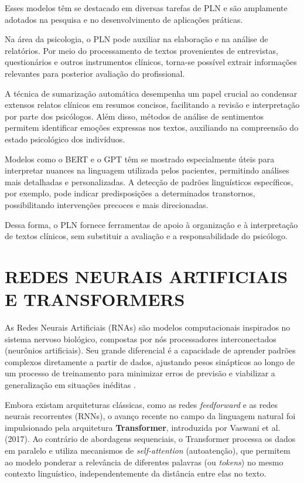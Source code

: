 Esses modelos têm se destacado em diversas tarefas de PLN e são amplamente adotados na pesquisa e no desenvolvimento de aplicações práticas.

Na área da psicologia, o PLN pode auxiliar na elaboração e na análise de relatórios. Por meio do processamento de textos provenientes de entrevistas, questionários e outros instrumentos clínicos, torna-se possível extrair informações relevantes para posterior avaliação do profissional.

A técnica de sumarização automática desempenha um papel crucial ao condensar extensos relatos clínicos em resumos concisos, facilitando a revisão e interpretação por parte dos psicólogos. Além disso, métodos de análise de sentimentos permitem identificar emoções expressas nos textos, auxiliando na compreensão do estado psicológico dos indivíduos.

Modelos como o BERT e o GPT têm se mostrado especialmente úteis para interpretar nuances na linguagem utilizada pelos pacientes, permitindo análises mais detalhadas e personalizadas. A detecção de padrões linguísticos específicos, por exemplo, pode indicar predisposições a determinados transtornos, possibilitando intervenções precoces e mais direcionadas.

Dessa forma, o PLN fornece ferramentas de apoio à organização e à interpretação de textos clínicos, sem substituir a avaliação e a responsabilidade do psicólogo.


\section{REDES NEURAIS ARTIFICIAIS E TRANSFORMERS}

As Redes Neurais Artificiais (RNAs) são modelos computacionais inspirados no sistema nervoso biológico, compostas por nós processadores interconectados (neurônios artificiais). Seu grande diferencial é a capacidade de aprender padrões complexos diretamente a partir de dados, ajustando pesos sinápticos ao longo de um processo de treinamento para minimizar erros de previsão e viabilizar a generalização em situações inéditas \cite{braga2014redes}.

Embora existam arquiteturas clássicas, como as redes \textit{feedforward} e as redes neurais recorrentes (RNNs), o avanço recente no campo da linguagem natural foi impulsionado pela arquitetura \textbf{Transformer}, introduzida por Vaswani et al. (2017). Ao contrário de abordagens sequenciais, o Transformer processa os dados em paralelo e utiliza mecanismos de \textit{self-attention} (autoatenção), que permitem ao modelo ponderar a relevância de diferentes palavras (ou \textit{tokens}) no mesmo contexto linguístico, independentemente da distância entre elas no texto.

